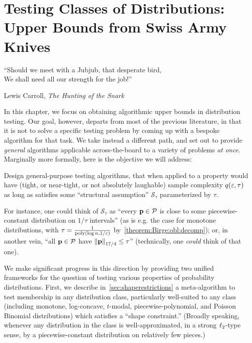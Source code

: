 \chapter{Testing Classes of Distributions: Upper Bounds from Swiss Army Knives}\label{chap:unified:ub}

\epigraph{``Should we meet with a Jubjub, that desperate bird,\\
We shall need all our strength for the job!''}{Lewis Carroll, \textit{The Hunting of the Snark}}

\renewcommand{\theIRL}{\textsf{Succinctness}}
\newcommand*{\inlineref}[1]{\refstepcounter{IRL}({\theIRL})\label{#1}}
\newcommand{\RightComment}[1]{\Comment{\parbox[t]{.30\linewidth}{\small#1}}} %

In this chapter, we focus on obtaining algorithmic upper bounds in distribution testing. Our goal, however, departs from most of the previous literature, in that it is not to solve a specific testing problem by coming up with a bespoke algorithm for that task. We take instead a different path, and set out to provide \emph{general} algorithms applicable across-the-board to a variety of problems \emph{at once}. Marginally more formally, here is the objective we will address:
\begin{problem}
Design general-purpose testing algorithms, that when applied to a property \property would have (tight, or near-tight, or not absolutely laughable) sample complexity $q(\eps, \tau)$ as long as \property satisfies some ``structural assumption'' $\mathcal{S}_\tau$ parameterized by $\tau$.
\end{problem}
\noindent For instance, one could think of $\mathcal{S}_\tau$ as ``every $\D\in\property$ is close to some piecewise-constant distribution on $1/\tau$ intervals'' (as is e.g. the case for monotone distributions, with $\tau=\frac{1}{\poly(\log n, 1/\eps)}$ by~\cref{theorem:Birge:obl:decomp}); or, in another vein, ``all $\D\in\property$ have $\norm{\D}_{17/4} \leq \tau$'' (technically, one \emph{could} think of that one).  

We make significant progress in this direction by providing two unified frameworks for the question of testing various properties of probability distributions. First, we describe in~\cref{sec:shaperestrictions} a meta-algorithm to test membership in any distribution class, particularly well-suited to any class (including monotone, log-concave, $t$-modal, piecewise-polynomial, and Poisson Binomial distributions) which satisfies a ``shape constraint.'' (Broadly speaking, whenever any distribution in the class is well-approximated, in a strong $\lp[2]$-type sense, by a piecewise-constant distribution on relatively few pieces.)

